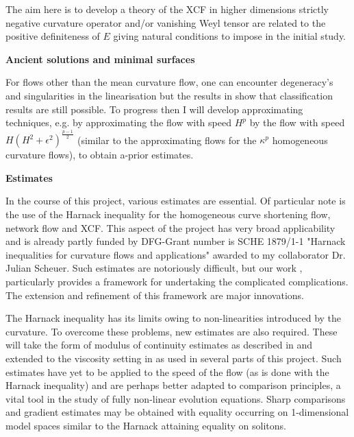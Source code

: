 \documentclass[12pt]{amsart}
\begin{document}
The aim here is to develop a theory of the XCF in higher dimensions strictly negative curvature operator and/or vanishing Weyl tensor are related to the positive definiteness of $E$ giving natural conditions to impose in the initial study.

\noindent\textbf{Ancient solutions and minimal surfaces}
\label{sec-3-8}


For flows other than the mean curvature flow, one can encounter degeneracy's and singularities in the linearisation but the results in \cite{2016arXiv160401694B} show that classification results are still possible. To progress then I will develop approximating techniques, e.g. by approximating the flow with speed $H^p$ by the flow with speed $H (H^2 + \epsilon^2)^{\tfrac{p-1}{2}}$ (similar to the approximating flows for the $\kappa^p$ homogeneous curvature flows), to obtain a-prior estimates.

\noindent\textbf{Estimates}
\label{sec-3-9}

In the course of this project, various estimates are essential. Of particular note is the use of the Harnack inequality for the homogeneous curve shortening flow, network flow and XCF. This aspect of the project has very broad applicability and is already partly funded by DFG-Grant number is SCHE 1879/1-1 "Harnack inequalities for curvature flows and applications" awarded to my collaborator Dr. Julian Scheuer. Such estimates are notoriously difficult, but our work \cite{2015arXiv150802821B,2015arXiv151203374B}, particularly \cite{BIS4} provides a framework for undertaking the complicated complications. The extension and refinement of this framework are major innovations.

The Harnack inequality has its limits owing to non-linearities introduced by the curvature. To overcome these problems, new estimates are also required. These will take the form of modulus of continuity estimates as described in \cite{MR3381494} and extended to the viscosity setting in \cite{MR3606561} as used in several parts of this project. Such estimates have yet to be applied to the speed of the flow (as is done with the Harnack inequality) and are perhaps better adapted to comparison principles, a vital tool in the study of fully non-linear evolution equations. Sharp comparisons and gradient estimates may be obtained with equality occurring on 1-dimensional model spaces similar to the Harnack attaining equality on solitons.

\smallskip{}
\label{sec-4}
\end{document}
